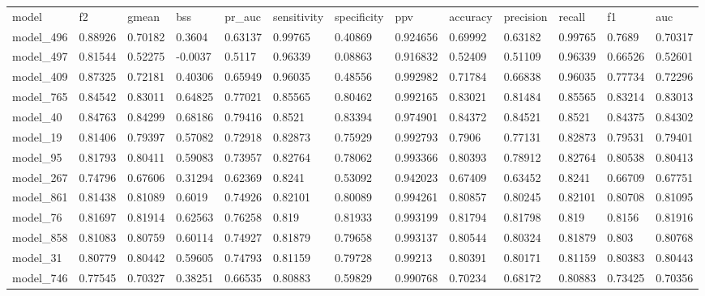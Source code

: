 \begin{tabular}{lllllllllllll}
model      & f2      & gmean   & bss      & pr\_auc & sensitivity & specificity & ppv      & accuracy & precision & recall  & f1      & auc     \\
model\_496 & 0.88926 & 0.70182 & 0.3604   & 0.63137 & 0.99765     & 0.40869     & 0.924656 & 0.69992  & 0.63182   & 0.99765 & 0.7689  & 0.70317 \\
model\_497 & 0.81544 & 0.52275 & -0.0037  & 0.5117  & 0.96339     & 0.08863     & 0.916832 & 0.52409  & 0.51109   & 0.96339 & 0.66526 & 0.52601 \\
model\_409 & 0.87325 & 0.72181 & 0.40306  & 0.65949 & 0.96035     & 0.48556     & 0.992982 & 0.71784  & 0.66838   & 0.96035 & 0.77734 & 0.72296 \\
model\_765 & 0.84542 & 0.83011 & 0.64825  & 0.77021 & 0.85565     & 0.80462     & 0.992165 & 0.83021  & 0.81484   & 0.85565 & 0.83214 & 0.83013 \\
model\_40  & 0.84763 & 0.84299 & 0.68186  & 0.79416 & 0.8521      & 0.83394     & 0.974901 & 0.84372  & 0.84521   & 0.8521  & 0.84375 & 0.84302 \\
model\_19  & 0.81406 & 0.79397 & 0.57082  & 0.72918 & 0.82873     & 0.75929     & 0.992793 & 0.7906   & 0.77131   & 0.82873 & 0.79531 & 0.79401 \\
model\_95  & 0.81793 & 0.80411 & 0.59083  & 0.73957 & 0.82764     & 0.78062     & 0.993366 & 0.80393  & 0.78912   & 0.82764 & 0.80538 & 0.80413 \\
model\_267 & 0.74796 & 0.67606 & 0.31294  & 0.62369 & 0.8241      & 0.53092     & 0.942023 & 0.67409  & 0.63452   & 0.8241  & 0.66709 & 0.67751 \\
model\_861 & 0.81438 & 0.81089 & 0.6019   & 0.74926 & 0.82101     & 0.80089     & 0.994261 & 0.80857  & 0.80245   & 0.82101 & 0.80708 & 0.81095 \\
model\_76  & 0.81697 & 0.81914 & 0.62563  & 0.76258 & 0.819       & 0.81933     & 0.993199 & 0.81794  & 0.81798   & 0.819   & 0.8156  & 0.81916 \\
model\_858 & 0.81083 & 0.80759 & 0.60114  & 0.74927 & 0.81879     & 0.79658     & 0.993137 & 0.80544  & 0.80324   & 0.81879 & 0.803   & 0.80768 \\
model\_31  & 0.80779 & 0.80442 & 0.59605  & 0.74793 & 0.81159     & 0.79728     & 0.99213  & 0.80391  & 0.80171   & 0.81159 & 0.80383 & 0.80443 \\
model\_746 & 0.77545 & 0.70327 & 0.38251  & 0.66535 & 0.80883     & 0.59829     & 0.990768 & 0.70234  & 0.68172   & 0.80883 & 0.73425 & 0.70356 \\

\end{tabular}
